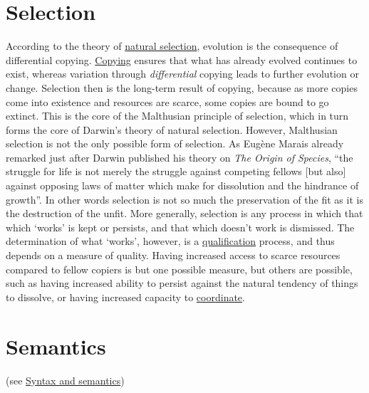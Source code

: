 \documentclass[12pt]{article}
\begin{document}
\hypertarget{selection}{}
\section{Selection}

According to the theory of \hyperlink{natural_selection}{natural
  selection}, evolution is the consequence of differential
copying. \hyperlink{copying_and_coding}{Copying} ensures that what has
already evolved continues to exist, whereas variation through {\em
  differential} copying leads to further evolution or
change. Selection then is the long-term result of copying, because as
more copies come into existence and resources are scarce, some copies
are bound to go extinct. This is the core of the Malthusian principle
of selection, which in turn forms the core of Darwin's theory of
natural selection. However, Malthusian selection is not the only
possible form of selection. As Eug\`ene Marais already remarked just
after Darwin published his theory on {\em The Origin of Species}, ``the
struggle for life is not merely the struggle against competing fellows
[but also] against opposing laws of matter which make for dissolution
and the hindrance of growth''. In other words selection is not so much
the preservation of the fit as it is the destruction of the unfit. More 
generally, selection is any process in which that which `works' is kept
or persists, and that which doesn't work is dismissed. The
determination of what `works', however, is a
\hyperlink{qualification}{qualification} process, and thus depends on
a measure of quality. Having increased access to scarce resources
compared to fellow copiers is but one possible measure, but others are
possible, such as having increased ability to persist against the
natural tendency of things to dissolve, or having increased capacity
to \hyperlink{coordinate}{coordinate}.

\hypertarget{semantics}{}
\section{Semantics}  

(see \hyperlink{syntax_and_semantics}{Syntax and semantics})

\hypertarget{semiosis}{}
\end{document}
